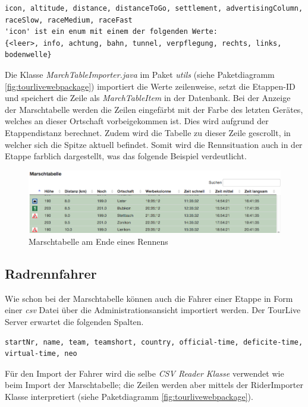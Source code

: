 \begin{lstlisting}[caption=Marschtabellen CSV Import, label=code:marchtableimport]
icon, altitude, distance, distanceToGo, settlement, advertisingColumn, raceSlow, raceMedium, raceFast
'icon' ist ein enum mit einem der folgenden Werte:
{<leer>, info, achtung, bahn, tunnel, verpflegung, rechts, links, bodenwelle}
\end{lstlisting}

Die Klasse \textit{MarchTableImporter.java} im Paket \textit{utils} (siehe Paketdiagramm \ref{fig:tourlivewebpackage}) importiert die Werte zeilenweise, setzt die Etappen-ID und speichert die Zeile als \textit{MarchTableItem} in der Datenbank. Bei der Anzeige der Marschtabelle werden die Zeilen eingefärbt mit der Farbe des letzten Gerätes, welches an dieser Ortschaft vorbeigekommen ist. Dies wird aufgrund der Etappendistanz berechnet. Zudem wird die Tabelle zu dieser Zeile gescrollt, in welcher sich die Spitze aktuell befindet. Somit wird die Rennsituation auch in der Etappe farblich dargestellt, was das folgende Beispiel verdeutlicht.

\begin{figure}[H]
	\centering
	\includegraphics[width=130mm]{images/tourliveweb/marschtabelle.png}
	\caption{Marschtabelle am Ende eines Rennens}
\end{figure}

\subsection{Radrennfahrer}
Wie schon bei der Marschtabelle können auch die Fahrer einer Etappe in Form einer \textit{\gls{csv}} Datei über die Administrationsansicht importiert werden. Der TourLive Server erwartet die folgenden Spalten.

\begin{lstlisting}[caption=Fahrerliste CSV Import, label=code:riderimport]
startNr, name, team, teamshort, country, official-time, deficite-time, virtual-time, neo
\end{lstlisting}

Für den Import der Fahrer wird die selbe \textit{CSV Reader Klasse} verwendet wie beim Import der Marschtabelle; die Zeilen werden aber mittels der RiderImporter Klasse interpretiert (siehe Paketdiagramm \ref{fig:tourlivewebpackage}).

